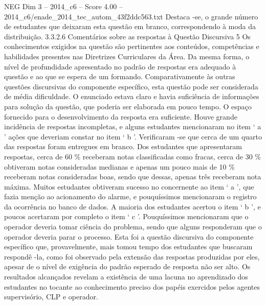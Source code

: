 \begin{textsample}{NEG Dim 3 – 2014\_c6 – Score 4.00 – 2014\_c6/enade\_2014\_tec\_autom\_43f2ddc563.txt}
Destaca -se, o grande número de estudantes que deixaram esta questão em branco, correspondendo à moda da distribuição. 3.3.2.6 Comentários sobre as respostas à Questão Discursiva 5 Os conhecimentos exigidos na questão são pertinentes aos conteúdos, competências e habilidades presentes nas Diretrizes Curriculares da Área.
Da mesma forma, o nível de profundidade apresentado no padrão de respostas era adequado à questão e ao que se espera de um formando.
Comparativamente às outras questões discursivas do componente específico, esta questão pode ser considerada de média dificuldade.
O enunciado estava claro e havia suficiência de informações para solução da questão, que poderia ser elaborada em pouco tempo.
O espaço fornecido para o desenvolvimento da resposta era suficiente.
Houve grande incidência de respostas incompletas, e alguns estudantes mencionaram no item ‘ a ’ ações que deveriam constar no item ‘ b ’.
Verificaram -se que cerca de um quarto das respostas foram entregues em branco.
Dos estudantes que apresentaram respostas, cerca de 60 \% receberam notas classificadas como fracas, cerca de 30 \% obtiveram notas consideradas medianas e apenas um pouco mais de 10 \% receberam notas consideradas boas, sendo que dessas, apenas três receberam nota máxima.
Muitos estudantes obtiveram sucesso no concernente ao item ‘ a ’, que fazia menção ao acionamento do alarme, e pouquíssimos mencionaram o registro da ocorrência no banco de dados.
A maioria dos estudantes acertou o item ‘ b ’, e poucos acertaram por completo o item ‘ c ’.
Pouquíssimos mencionaram que o operador deveria tomar ciência do problema, sendo que alguns responderam que o operador deveria parar o processo.
Esta foi a questão discursiva do componente específico que, provavelmente, mais tomou tempo dos estudantes que buscaram respondê -la, como foi observado pela extensão das respostas produzidas por eles, apesar de o nível de exigência do padrão esperado de resposta não ser alto.
Os resultados alcançados revelam a existência de uma lacuna no aprendizado dos estudantes no tocante ao conhecimento preciso dos papéis exercidos pelos agentes supervisório, CLP e operador.

\end{textsample}
